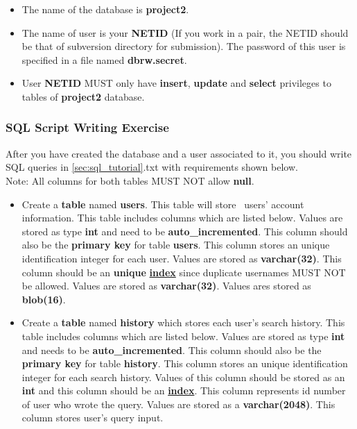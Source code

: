 \documentclass[letterpaper,12pt]{report}
\begin{document}
\begin{itemize}
\item The name of the database is \textbf{project2}.
\item The name of user is your \textbf{NETID} (If you work in a pair, the NETID should be that of subversion directory for submission). The password of this user is specified in a file named \textbf{dbrw.secret}.
\item User \textbf{NETID} MUST only have \textbf{insert}, \textbf{update} and \textbf{select} privileges to tables of \textbf{project2} database. 
\end{itemize}

\subsubsection{SQL Script Writing Exercise}
\label{sec:sql_tutorial_ex}
After you have created the database and a user associated to it, you should write SQL queries in \ref{sec:sql_tutorial}.txt with requirements shown below.\\
Note: All columns for both tables MUST NOT allow \textbf{null}.

\begin{itemize}
\item Create a \textbf{table} named \textbf{users}. This table will store \bungle\ users' account information. This table includes columns which are listed below. 
 Values are stored as type \textbf{int} and need to be \textbf{auto\_incremented}. This column should also be the \textbf{primary key} for table \textbf{users}. This column stores an unique identification integer for each user.
 Values are stored as \textbf{varchar(32)}. This column should be an \textbf{unique} \href{http://dev.mysql.com/doc/refman/5.7/en/mysql-indexes.html}{\textbf{index}} since duplicate usernames MUST NOT be allowed.
 Values are stored as \textbf{varchar(32)}.
 Values ares stored as \textbf{blob(16)}.
\item Create a \textbf{table} named \textbf{history} which stores each user's search history. This table includes columns which are listed below. 
 Values are stored as type \textbf{int} and needs to be \textbf{auto\_incremented}. This column should also be the \textbf{primary key} for table \textbf{history}. This column stores an unique identification integer for each search history.
 Values of this column should be stored as an \textbf{int} and this column should be an \href{http://dev.mysql.com/doc/refman/5.7/en/mysql-indexes.html}{\textbf{index}}. This column represents id number of user who wrote the query.
 Values are stored as a \textbf{varchar(2048)}. This column stores user's query input.
\end{itemize}
\end{document}
